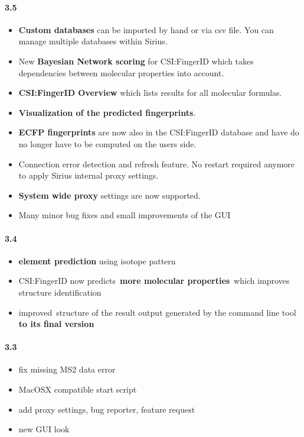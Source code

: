 \paragraph{3.5}

\begin{itemize}

\item
  \textbf{Custom databases} can be imported by hand or via csv file. You
  can manage multiple databases within Sirius.
\item
  New \textbf{Bayesian Network scoring} for CSI:FingerID which takes
  dependencies between molecular properties into account.
\item
  \textbf{CSI:FingerID Overview} which lists results for all molecular
  formulas.
\item
  \textbf{Visualization of the predicted fingerprints}.
\item
  \textbf{ECFP fingerprints} are now also in the CSI:FingerID database
  and have do no longer have to be computed on the users side.
\item
  Connection error detection and refresh feature. No restart required
  anymore to apply Sirius internal proxy settings.
\item
  \textbf{System wide proxy} settings are now supported.
\item
  Many minor bug fixes and small improvements of the GUI
\end{itemize}

\paragraph{3.4}

\begin{itemize}

\item
  \textbf{element prediction} using isotope pattern
\item
  CSI:FingerID now predicts~\textbf{more molecular properties}~which
  improves structure identification
\item
  improved~structure of the result output generated by the command line
  tool \textbf{to its final version}
\end{itemize}

\paragraph{3.3}

\begin{itemize}

\item
  fix missing MS2 data error
\item
  MacOSX compatible start script
\item
  add proxy settings, bug reporter, feature request
\item
  new GUI look
\end{itemize}

